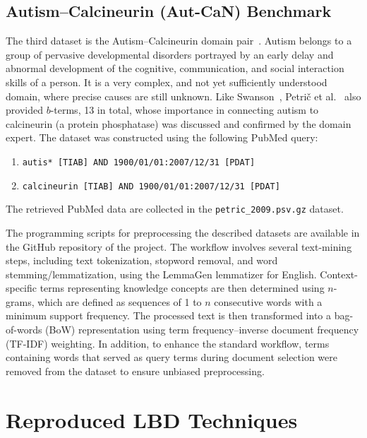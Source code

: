 \documentclass[runningheads]{llncs}
\begin{document}
\subsection{Autism--Calcineurin (Aut-CaN) Benchmark}

The third dataset is the Autism--Calcineurin domain pair~\cite{petric2009literature}. Autism belongs to a group of pervasive developmental disorders portrayed by an early delay and abnormal development of the cognitive, communication, and social interaction skills of a person. It is a very complex, and not yet sufficiently understood domain, where precise causes are still unknown. Like Swanson~\cite{swanson1986fish,swanson1988migraine}, Petri\v{c} et al.~\cite{petric2009literature} also provided $b$-terms, 13 in total, whose importance in connecting autism to calcineurin (a protein phosphatase) was discussed and confirmed by the domain expert. The dataset was constructed using the following PubMed query:
\begin{enumerate}
    \item \texttt{autis* [TIAB] AND 1900/01/01:2007/12/31 [PDAT]}
    \item \texttt{calcineurin [TIAB] AND 1900/01/01:2007/12/31 [PDAT]}
\end{enumerate}
The retrieved PubMed data are collected in the \texttt{petric\_2009.psv.gz} dataset.

The programming scripts for preprocessing the described datasets are available in the GitHub repository of the project. The workflow involves several text-mining steps, including text tokenization, stopword removal, and word stemming/lemmatization, using the LemmaGen lemmatizer for English. Context-specific terms representing knowledge concepts are then determined using $n$-grams, which are defined as sequences of 1 to $n$ consecutive words with a minimum support frequency. The processed text is then transformed into a bag-of-words (BoW) representation using term frequency--inverse document frequency (TF-IDF) weighting. In addition, to enhance the standard workflow, terms containing words that served as query terms during document selection were removed from the dataset to ensure unbiased preprocessing.

\section{Reproduced LBD Techniques}
\label{sec:reproduced_techniques}
\end{document}
